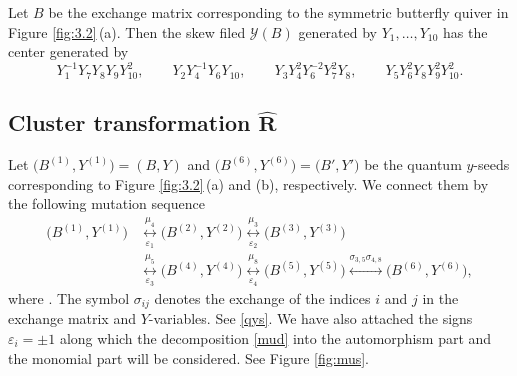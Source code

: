 \documentclass[11pt]{article}
\numberwithin{equation}{section}
\newcommand\bY{Y}
\numberwithin{equation}{section}
\begin{document}
\begin{Remark}\label{re:c1}
 Let $B$ be the exchange matrix corresponding to the symmetric
 butterfly quiver in Figure \ref{fig:3.2}\,(a). Then the skew filed
 $\mathcal{Y}(B)$ generated by $Y_1, \dots, Y_{10}$ has the center
 generated by
\[
Y^{-1}_1Y_7Y_8Y_9Y^2_{10},\qquad
Y_2Y^{-1}_4Y_6Y_{10},\qquad
Y_3Y^2_4Y^{-2}_6Y^2_7Y_8,\qquad
Y_5Y^2_6Y_8Y^2_9Y^2_{10}.
\]


\end{Remark}

\subsection[Cluster transformation R]{Cluster transformation $\boldsymbol{\widehat{R}}$}

Let $\bigl(B^{(1)}, \bY^{(1)}\bigr) = (B, \bY)$ and
$\bigl(B^{(6)}, \bY^{(6)}\bigr) = \bigl(B', \bY'\bigr)$ be the quantum $y$-seeds corresponding to Figure \ref{fig:3.2}\,(a) and (b), respectively.
We connect them by the following mutation sequence
%
\begin{align}
\bigl(B^{(1)}, \bY^{(1)}\bigr) &\underset{\varepsilon_1}{\overset{\mu_4}{\longleftrightarrow}}
\bigl(B^{(2)}, \bY^{(2)}\bigr) \underset{\varepsilon_2}{\overset{\mu_3}{\longleftrightarrow}}
\bigl(B^{(3)}, \bY^{(3)}\bigr)\nonumber
\\
&\underset{\varepsilon_3}{\overset{\mu_5}{\longleftrightarrow}}
\bigl(B^{(4)}, \bY^{(4)}\bigr) \underset{\varepsilon_4}{\overset{\mu_8}{\longleftrightarrow}}
\bigl(B^{(5)}, \bY^{(5)}\bigr) \overset{\sigma_{3,5}\sigma_{4,8}}{\longleftrightarrow}
\bigl(B^{(6)}, \bY^{(6)}\bigr),\label{mus}
\end{align}
where \smash{$\bY^{(t)}=\bigl(Y^{(t)}_1,\dotsc, Y^{(t)}_{10}\bigr)$}. The symbol
$\sigma_{ij}$ denotes the exchange of the indices $i$ and $j$ in the
exchange matrix and $Y$-variables. See \eqref{qys}. We have also
attached the signs $\varepsilon_i=\pm 1$ along which the decomposition
\eqref{mud} into the automorphism part and the monomial part will be
considered. See Figure \ref{fig:mus}.
\end{document}
